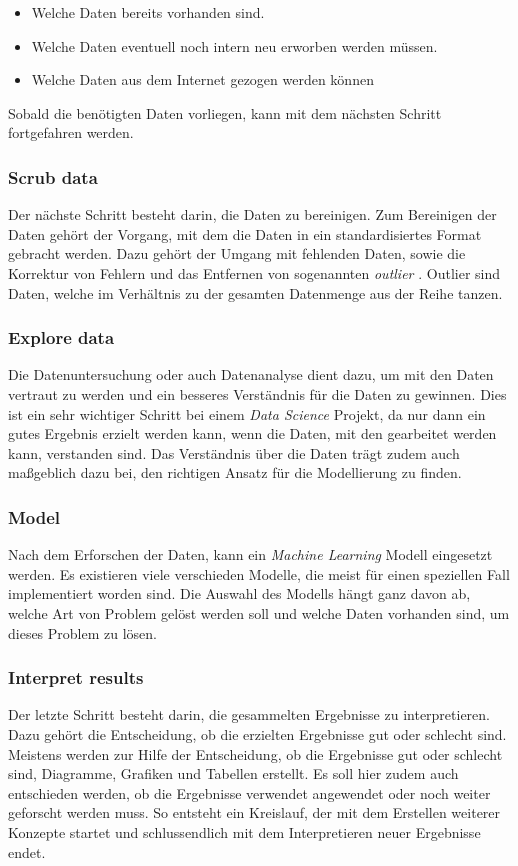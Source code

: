 \begin{itemize}
    \item Welche Daten bereits vorhanden sind.
    \item Welche Daten eventuell noch intern neu erworben werden müssen.
    \item Welche Daten aus dem Internet gezogen werden können
\end{itemize}

Sobald die benötigten Daten vorliegen, kann mit dem nächsten Schritt fortgefahren werden.

\subsubsection{Scrub data}
Der nächste Schritt besteht darin, die Daten zu bereinigen. Zum Bereinigen der Daten gehört der Vorgang, mit dem die Daten in ein standardisiertes Format gebracht werden. Dazu gehört der Umgang mit fehlenden Daten, sowie die Korrektur von Fehlern und das Entfernen von sogenannten \emph{outlier} \cite{Vorgehen_ds}. Outlier sind Daten, welche im Verhältnis zu der gesamten Datenmenge aus der Reihe tanzen. 

\subsubsection{Explore data}
Die Datenuntersuchung oder auch Datenanalyse dient dazu, um mit den Daten vertraut zu werden und ein besseres Verständnis für die Daten zu gewinnen. Dies ist ein sehr wichtiger Schritt bei einem \emph{Data Science} Projekt, da nur dann ein gutes Ergebnis erzielt werden kann, wenn die Daten, mit den gearbeitet werden kann, verstanden sind. Das Verständnis über die Daten trägt zudem auch maßgeblich dazu bei, den richtigen Ansatz für die Modellierung zu finden.

\subsubsection{Model}
Nach dem Erforschen der Daten, kann ein \emph{Machine Learning} Modell eingesetzt werden. Es existieren viele verschieden Modelle, die meist für einen  speziellen Fall implementiert worden sind. Die Auswahl des Modells hängt ganz davon ab, welche Art von Problem gelöst werden soll und welche Daten vorhanden sind, um dieses Problem zu lösen. 

\subsubsection{Interpret results}
Der letzte Schritt besteht darin, die gesammelten Ergebnisse zu interpretieren. Dazu gehört die Entscheidung, ob die erzielten Ergebnisse gut oder schlecht sind. Meistens werden zur Hilfe der Entscheidung, ob die Ergebnisse gut oder schlecht sind, Diagramme, Grafiken und Tabellen erstellt. Es soll hier zudem auch entschieden werden, ob die Ergebnisse verwendet angewendet oder noch weiter geforscht werden muss. So entsteht ein Kreislauf, der mit dem Erstellen weiterer Konzepte startet und schlussendlich mit dem Interpretieren neuer Ergebnisse endet.
